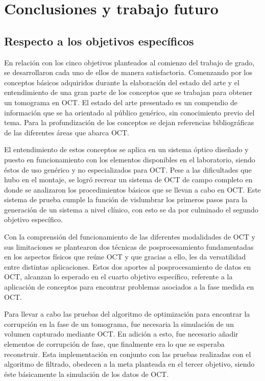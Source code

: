 \chapter{Conclusiones y trabajo futuro}
\label{chapter:conclusiones}

\section{Respecto a los objetivos específicos}

En relación con los cinco objetivos planteados al comienzo del trabajo de grado, se desarrollaron cada uno de ellos de manera satisfactoria. Comenzando por los conceptos básicos adquiridos durante la elaboración del estado del arte y el entendimiento de una gran parte de los conceptos que se trabajan para obtener un tomograma en OCT. El estado del arte presentado es un compendio de información que se ha orientado al público genérico, sin conocimiento previo del tema. Para la profundización de los conceptos se dejan referencias bibliográficas de las diferentes áreas que abarca OCT.

El entendimiento de estos conceptos se aplica en un sistema óptico diseñado y puesto en funcionamiento con los elementos disponibles en el laboratorio, siendo éstos de uso genérico y no especializados para OCT. Pese a las dificultades que hubo en el montaje, se logró recrear un sistema de OCT de campo completo en donde se analizaron los procedimientos básicos que se llevan a cabo en OCT. Este sistema de prueba cumple la función de vislumbrar los primeros pasos para la generación de un sistema a nivel clínico, con esto se da por culminado el segundo objetivo específico.

Con la comprensión del funcionamiento de las diferentes modalidades de OCT y sus limitaciones se plantearon dos técnicas de posprocesamiento fundamentadas en los aspectos físicos que reúne OCT y que gracias a ello, les da versatilidad entre distintas aplicaciones. Estos dos aportes al posprocesamiento de datos en OCT, alcanzan lo esperado en el cuarto objetivo específico, referente a la aplicación de conceptos para encontrar problemas asociados a la fase medida en OCT.

Para llevar a cabo las pruebas del algoritmo de optimización para encontrar la corrupción en la fase de un tomograma, fue necesaria la simulación de un volumen capturado mediante OCT. En adición a esto, fue necesario añadir elementos de corrupción de fase, que finalmente era lo que se esperaba reconstruir. Esta implementación en conjunto con las pruebas realizadas con el algoritmo de filtrado, obedecen a la meta planteada en el tercer objetivo, siendo éste básicamente la simulación de los datos de OCT.

